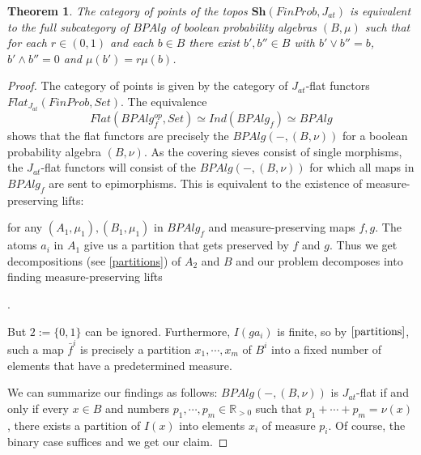 \documentclass[a4paper]{amsproc}
\theoremstyle{plain}
\newtheorem{theorem}{Theorem}[section]
\theoremstyle{definition}
\theoremstyle{remark}
\numberwithin{equation}{section}
\begin{document}
\begin{theorem} The category of points of the topos $\textbf{Sh}(FinProb,J_{at})$ is equivalent to the full subcategory of $BPAlg$ of boolean probability algebras $(B,\mu)$ such that for each $r\in (0,1)$ and each $b\in B$ there exist $b', b''\in B$ with $b'\vee b''=b$, $b'\wedge b''=0$ and $\mu(b')=r\mu(b)$.\end{theorem}
\begin{proof} The category of points is given by the category of $J_{at}$-flat functors $Flat_{J_{at}}(FinProb, Set)$.  The equivalence 
\[
Flat(BPAlg_f^{op}, Set) \simeq Ind(BPAlg_f) \simeq BPAlg
\]
shows that the flat functors are precisely the $BPAlg(-,(B,\nu))$ for a boolean probability algebra $(B,\nu)$. As the covering sieves consist of single morphisms, the $J_{at}$-flat functors will consist of the $BPAlg(-,(B,\nu))$ for which all maps in $BPAlg_f$ are sent to epimorphisms. This is equivalent to the existence of measure-preserving lifts:
\begin{center}
\end{center}
for any $(A_1,\mu_1), (B_1,\mu_1)$ in $BPAlg_f$ and measure-preserving maps $f,g$. The atoms $a_i$ in $A_1$ give us a partition that gets preserved by $f$ and $g$. Thus we get decompositions (see \ref{partitions}) of $A_2$ and $B$ and our problem decomposes into finding measure-preserving lifts

\begin{center}
.
\end{center}
But $2 := \{0, 1\}$ can be ignored. Furthermore, $I(g a_i)$ is finite, so by $\ref{partitions}$, such a map $\bar{f}^i$ is precisely a partition $x_1, \cdots, x_m$ of $B^i$ into a fixed number of elements that have a predetermined measure.

We can summarize our findings as follows: $BPAlg(-, (B,\nu))$ is $J_{at}$-flat if and only if every $x \in B$ and numbers $p_1, \cdots, p_m \in \mathbb{R}_{>0}$ such that $p_1 + \cdots + p_m = \nu(x)$, there exists a partition of $I(x)$ into elements $x_i$ of measure $p_i$. Of course, the binary case suffices and we get our claim.
\end{proof}
\end{document}
